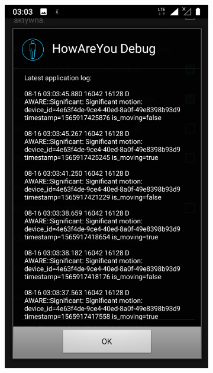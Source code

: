\begin{figure}[H]
	\centering
	\begin{subfigure}{0.35\textwidth}
		\centering
		\includegraphics[scale=0.13]{rozdzial3/Ustawienia_logAplikacji.png}
		\subcaption{\label{subfigure_a}}
	\end{subfigure}
	\begin{subfigure}{0.35\textwidth}
		\centering

\end{subfigure}
\end{figure}
